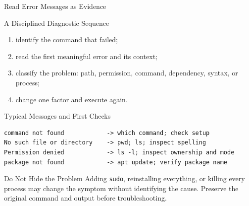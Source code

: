 \begin{frame}[fragile]{Read Error Messages as Evidence}

\footnotesize

\begin{block}{A Disciplined Diagnostic Sequence}
\begin{enumerate}
    \setlength{\itemsep}{0.18em}
    \item identify the command that failed;
    \item read the first meaningful error and its context;
    \item classify the problem: path, permission, command, dependency, syntax, or process;
    \item change one factor and execute again.
\end{enumerate}
\end{block}

\begin{exampleblock}{Typical Messages and First Checks}
\begin{verbatim}
command not found            -> which command; check setup
No such file or directory    -> pwd; ls; inspect spelling
Permission denied            -> ls -l; inspect ownership and mode
package not found            -> apt update; verify package name
\end{verbatim}
\end{exampleblock}

\begin{alertblock}{Do Not Hide the Problem}
Adding \texttt{sudo}, reinstalling everything, or killing every process may
change the symptom without identifying the cause. Preserve the original command
and output before troubleshooting.
\end{alertblock}
\end{frame}

